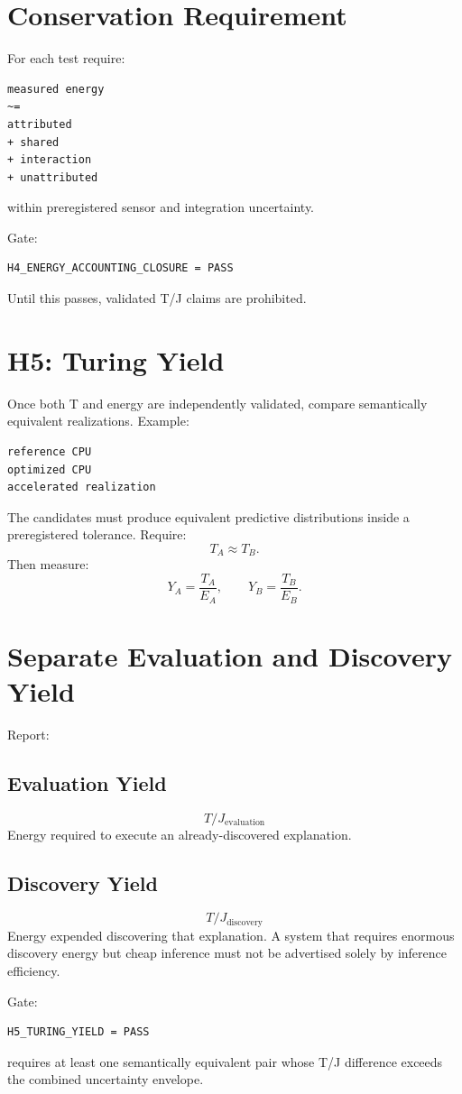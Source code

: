 \documentclass[11pt]{article}
\begin{document}
\section{Conservation Requirement}

For each test require:
\begin{verbatim}
measured energy
~=
attributed
+ shared
+ interaction
+ unattributed
\end{verbatim}
within preregistered sensor and integration uncertainty.

Gate:
\begin{verbatim}
H4_ENERGY_ACCOUNTING_CLOSURE = PASS
\end{verbatim}
Until this passes, validated T/J claims are prohibited.

\section{H5: Turing Yield}

Once both T and energy are independently validated, compare semantically equivalent realizations. Example:
\begin{verbatim}
reference CPU
optimized CPU
accelerated realization
\end{verbatim}
The candidates must produce equivalent predictive distributions inside a preregistered tolerance. Require:
\[
T_A \approx T_B.
\]
Then measure:
\[
Y_A = \frac{T_A}{E_A},
\qquad
Y_B = \frac{T_B}{E_B}.
\]

\section{Separate Evaluation and Discovery Yield}

Report:

\subsection*{Evaluation Yield}
\[
T/J_{\text{evaluation}}
\]
Energy required to execute an already-discovered explanation.

\subsection*{Discovery Yield}
\[
T/J_{\text{discovery}}
\]
Energy expended discovering that explanation. A system that requires enormous discovery energy but cheap inference must not be advertised solely by inference efficiency.

Gate:
\begin{verbatim}
H5_TURING_YIELD = PASS
\end{verbatim}
requires at least one semantically equivalent pair whose T/J difference exceeds the combined uncertainty envelope.
\end{document}
